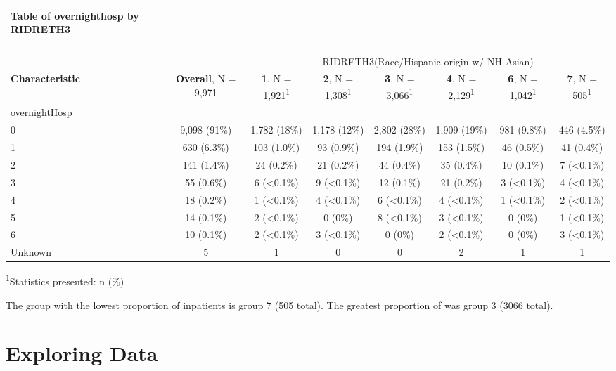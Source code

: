 \documentclass[]{article}
\begin{document}
\captionsetup[table]{labelformat=empty,skip=1pt}
\begin{longtable}{lccccccc}
\caption*{
\large Table of overnighthosp by RIDRETH3\\ 
\small \\ 
} \\ 
\toprule
& & \multicolumn{6}{c}{RIDRETH3(Race/Hispanic origin w/ NH Asian)} \\ 
 \cmidrule(lr){3-8}
\textbf{Characteristic} & \textbf{Overall}, N = 9,971 & \textbf{1}, N = 1,921\textsuperscript{1} & \textbf{2}, N = 1,308\textsuperscript{1} & \textbf{3}, N = 3,066\textsuperscript{1} & \textbf{4}, N = 2,129\textsuperscript{1} & \textbf{6}, N = 1,042\textsuperscript{1} & \textbf{7}, N = 505\textsuperscript{1} \\ 
\midrule
overnightHosp &  &  &  &  &  &  &  \\ 
0 & 9,098 (91\%) & 1,782 (18\%) & 1,178 (12\%) & 2,802 (28\%) & 1,909 (19\%) & 981 (9.8\%) & 446 (4.5\%) \\ 
1 & 630 (6.3\%) & 103 (1.0\%) & 93 (0.9\%) & 194 (1.9\%) & 153 (1.5\%) & 46 (0.5\%) & 41 (0.4\%) \\ 
2 & 141 (1.4\%) & 24 (0.2\%) & 21 (0.2\%) & 44 (0.4\%) & 35 (0.4\%) & 10 (0.1\%) & 7 (<0.1\%) \\ 
3 & 55 (0.6\%) & 6 (<0.1\%) & 9 (<0.1\%) & 12 (0.1\%) & 21 (0.2\%) & 3 (<0.1\%) & 4 (<0.1\%) \\ 
4 & 18 (0.2\%) & 1 (<0.1\%) & 4 (<0.1\%) & 6 (<0.1\%) & 4 (<0.1\%) & 1 (<0.1\%) & 2 (<0.1\%) \\ 
5 & 14 (0.1\%) & 2 (<0.1\%) & 0 (0\%) & 8 (<0.1\%) & 3 (<0.1\%) & 0 (0\%) & 1 (<0.1\%) \\ 
6 & 10 (0.1\%) & 2 (<0.1\%) & 3 (<0.1\%) & 0 (0\%) & 2 (<0.1\%) & 0 (0\%) & 3 (<0.1\%) \\ 
Unknown & 5 & 1 & 0 & 0 & 2 & 1 & 1 \\ 
\bottomrule
\end{longtable}
\vspace{-5mm}
\begin{minipage}{\linewidth}
\textsuperscript{1}Statistics presented: n (\%) \\ 
\end{minipage}

The group with the lowest proportion of inpatients is group 7 (505
total). The greatest proportion of was group 3 (3066 total).

\hypertarget{exploring-data}{%
\section{Exploring Data}\label{exploring-data}}
\end{document}
